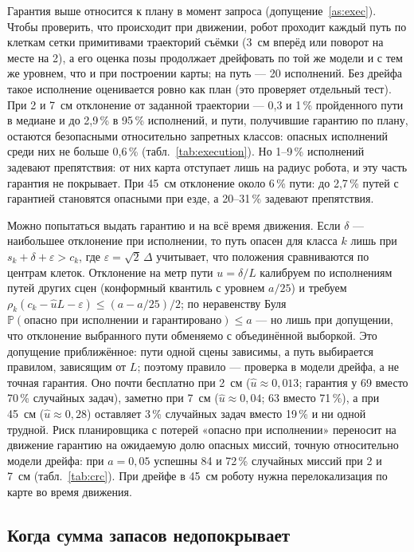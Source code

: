 Гарантия выше относится к плану в момент запроса (допущение~\ref{as:exec}). Чтобы проверить, что происходит при движении, робот проходит каждый путь по клеткам сетки примитивами траекторий съёмки (3~см вперёд или поворот на месте на 2\textdegree{}), а его оценка позы продолжает дрейфовать по той же модели и с тем же уровнем, что и при построении карты; на путь --- 20 исполнений. Без дрейфа такое исполнение оценивается ровно как план (это проверяет отдельный тест). При 2 и 7~см отклонение от заданной траектории --- 0,3 и 1\,\% пройденного пути в медиане и до 2,9\,\% в 95\,\% исполнений, и пути, получившие гарантию по плану, остаются безопасными относительно запретных классов: опасных исполнений среди них не больше 0,6\,\% (табл.~\ref{tab:execution}). Но 1--9\,\% исполнений задевают препятствия: от них карта отступает лишь на радиус робота, и эту часть гарантия не покрывает. При 45~см отклонение около 6\,\% пути: до 2,7\,\% путей с гарантией становятся опасными при езде, а 20--31\,\% задевают препятствия.

Можно попытаться выдать гарантию и на всё время движения. Если $\delta$ --- наибольшее отклонение при исполнении, то путь опасен для класса $k$ лишь при $s_k + \delta + \varepsilon > c_k$, где $\varepsilon = \sqrt 2\,\Delta$ учитывает, что положения сравниваются по центрам клеток. Отклонение на метр пути $u = \delta/L$ калибруем по исполнениям путей других сцен (конформный квантиль с уровнем $a/25$) и требуем $\rho_k(c_k - \hat u L - \varepsilon) \le (a - a/25)/2$; по неравенству Буля $\mathbb P(\text{опасно при исполнении и гарантировано}) \le a$ --- но лишь при допущении, что отклонение выбранного пути обменяемо с объединённой выборкой. Это допущение приближённое: пути одной сцены зависимы, а путь выбирается правилом, зависящим от $L$; поэтому правило --- проверка в модели дрейфа, а не точная гарантия. Оно почти бесплатно при 2~см ($\hat u \approx 0{,}013$; гарантия у 69 вместо 70\,\% случайных задач), заметно при 7~см ($\hat u \approx 0{,}04$; 63 вместо 71\,\%), а при 45~см ($\hat u \approx 0{,}28$) оставляет 3\,\% случайных задач вместо 19\,\% и ни одной трудной. Риск планировщика с потерей «опасно при исполнении» переносит на движение гарантию на ожидаемую долю опасных миссий, точную относительно модели дрейфа: при $a = 0{,}05$ успешны 84 и 72\,\% случайных миссий при 2 и 7~см (табл.~\ref{tab:crc}). При дрейфе в 45~см роботу нужна перелокализация по карте во время движения.

\subsection{Когда сумма запасов недопокрывает}\label{sec:composition}


